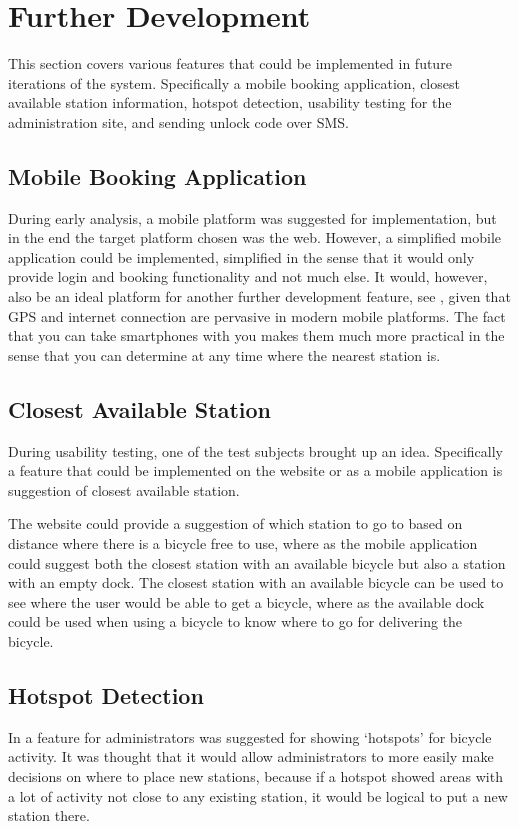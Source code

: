 \section{Further Development}\label{sec:furdev}
This section covers various features that could be implemented in future iterations of the system. Specifically a mobile booking application, closest available station information, hotspot detection, usability testing for the administration site, and sending unlock code over SMS.

\subsection{Mobile Booking Application}\label{sec:fd-mobileapp}
During early analysis, a mobile platform was suggested for implementation, but in the end the target platform chosen was the web. 
However, a simplified mobile application could be implemented, simplified in the sense that it would only provide login and booking functionality and not much else.
It would, however, also be an ideal platform for another further development feature, see , given that GPS and internet connection are pervasive in modern mobile platforms.
The fact that you can take smartphones with you makes them much more practical in the sense that you can determine at any time where the nearest station is.

\subsection{Closest Available Station}\label{subsec:closeststation}
During usability testing, one of the test subjects brought up an idea.
Specifically a feature that could be implemented on the website or as a mobile application is suggestion of closest available station.

The website could provide a suggestion of which station to go to based on distance where there is a bicycle free to use, where as the mobile application could suggest both the closest station with an available bicycle but also a station with an empty dock.
The closest station with an available bicycle can be used to see where the user would be able to get a bicycle, where as the available dock could be used when using a bicycle to know where to go for delivering the bicycle.

\subsection{Hotspot Detection}
In  a feature for administrators was suggested for showing `hotspots' for bicycle activity. 
It was thought that it would allow administrators to more easily make decisions on where to place new stations, because if a hotspot showed areas with a lot of activity not close to any existing station, it would be logical to put a new station there.

